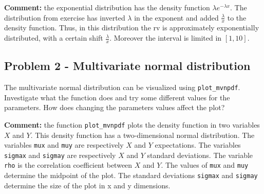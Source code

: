 \documentclass[letterpaper,12pt]{article}
\begin{document}
\begin{figure}
    \quad
    \label{fig:example}
\end{figure}
\begin{tcolorbox}
\textbf{Comment:}
the exponential distribution has the density function $\lambda e^{-\lambda x}$. The distribution from exercise has inverted $\lambda $ in the exponent and added $\frac{\lambda}{x}$ to the density function. Thus, in this distribution the rv is approximately exponentially distributed, with a certain shift $\frac{\lambda}{x}$. Moreover the interval is limited in $[1, 10]$.
\end{tcolorbox}

\subsection*{Problem 2 - Multivariate normal distribution}
The multivariate normal distribution can be visualized using \texttt{plot\_mvnpdf}. Investigate what the function does and try some different values for the parameters. How does changing the parameters values affect the plot?
\begin{tcolorbox}
\textbf{Comment:}
the function \texttt{plot\_mvnpdf} plots the density function in two variables $X$ and $Y$. This density function has a two-dimensional normal distribution. The variables \texttt{mux} and \texttt{muy} are respectively $X$ and $Y$ expectations. The variables \texttt{sigmax} and \texttt{sigmay} are respectively $X$ and $Y$ standard deviations. The variable \texttt{rho} is the correlation coefficient between $X$ and $Y$. The values of \texttt{mux} and \texttt{muy} determine the midpoint of the plot. The standard deviations \texttt{sigmax} and \texttt{sigmay} determine the size of the plot in x and y dimensions.
\end{tcolorbox}
\end{document}
